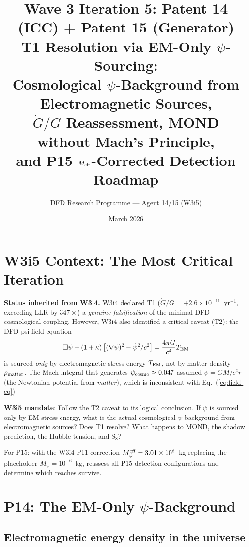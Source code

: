 \documentclass[11pt]{article}
\title{Wave 3 Iteration 5: Patent 14 (ICC) + Patent 15 (Generator)\\
\large T1 Resolution via EM-Only $\psi$-Sourcing:\\
Cosmological $\psi$-Background from Electromagnetic Sources,\\
$\dot{G}/G$ Reassessment, MOND without Mach's Principle,\\
and P15 $M_{\rm eff}$-Corrected Detection Roadmap}
\author{DFD Research Programme --- Agent 14/15 (W3i5)}
\date{March 2026}
\newcommand{\ee}[1]{\times 10^{#1}}
\newcommand{\Gdot}{\dot{G}/G}
\newcommand{\psicosmo}{\bar{\psi}_{\rm cosmo}}
\newcommand{\Mpsi}{M_\psi}
\newcommand{\Meff}{M_\psi^{\rm eff}}
\begin{document}
\maketitle
\tableofcontents
\newpage

\section*{W3i5 Context: The Most Critical Iteration}

\noindent\textbf{Status inherited from W3i4.}
W3i4 declared T1 ($\Gdot = +2.6\ee{-11}$~yr$^{-1}$, exceeding LLR by $347\times$)
a \emph{genuine falsification} of the minimal DFD cosmological coupling. However,
W3i4 also identified a critical caveat (T2): the DFD psi-field equation
\begin{equation}
\Box\psi + (1+\kappa)\left[(\nabla\psi)^2 - \dot{\psi}^2/c^2\right]
= \frac{4\pi G}{c^4} T_{\rm EM}
\label{eq:field-eq}
\end{equation}
is sourced \emph{only} by electromagnetic stress-energy $T_{\rm EM}$, not by
matter density $\rho_{\rm matter}$. The Mach integral that generates
$\psicosmo \approx 0.047$ assumed $\psi = GM/c^2r$ (the Newtonian
potential from \emph{matter}), which is inconsistent with Eq.~(\ref{eq:field-eq}).

\textbf{W3i5 mandate}: Follow the T2 caveat to its logical conclusion.
If $\psi$ is sourced only by EM stress-energy, what is the actual cosmological
$\psi$-background from electromagnetic sources? Does T1 resolve? What happens
to MOND, the shadow prediction, the Hubble tension, and S$_8$?

For P15: with the W3i4 P11 correction $\Meff = 3.01\ee{6}$~kg replacing
the placeholder $\Mpsi = 10^{-6}$~kg, reassess all P15 detection
configurations and determine which reaches survive.

\section{P14: The EM-Only $\psi$-Background}
\label{sec:EM-only}

\subsection{Electromagnetic energy density in the universe}
\end{document}
